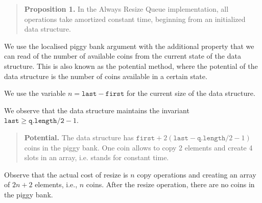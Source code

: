 \documentclass{tufte-handout}
\begin{document}
\begin{quote}
  {\bf Proposition 1.} In the Always Resize Queue implementation, all operations take amortized constant time, beginning from an initialized data structure.
\end{quote}

We use the localised piggy bank argument with the additional property that we can read of the number of available coins from the current state of the data structure.
This is also known as the potential method, where the potential of the data structure is the number of coins available in a certain state.

We use the variable $n = \texttt{last} - \texttt{first}$ for the current size of the data structure.

We observe that the data structure maintains the invariant $\texttt{last} \geq \texttt{q.length/2} -1$. 
\begin{quote}
  {\bf Potential.} The data structure has $\texttt{first} + 2(\texttt{last} - \texttt{q.length}/2 -1)$ coins in the piggy bank.
  One coin allows to copy 2 elements and create 4 slots in an array, i.e. stands for constant time.
\end{quote}

Observe that the actual cost of resize is $n$ copy operations and creating an array of $2n+2$ elements, i.e., $n$ coins.
After the resize operation, there are no coins in the piggy bank.
\end{document}
